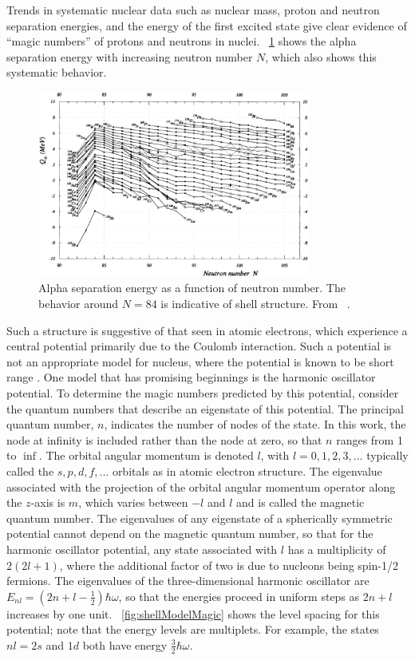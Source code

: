 Trends in systematic nuclear data such as nuclear mass, proton and neutron separation energies, and the energy of the first excited state give clear evidence of ``magic numbers'' of protons and neutrons in nuclei.  {\fig}~\ref{fig:alphaSep} shows the alpha separation energy with increasing neutron number $N$, which also shows this systematic behavior.  
\begin{figure}[htp]
\centering
\includegraphics[width=0.8\textwidth]{figures/alphaSepEnergy.eps}
\caption[Alpha separation energy as an illustration of shell structure.]{Alpha separation energy as a function of neutron number.  The behavior around $N=84$ is indicative of shell structure.  From {}~\cite{massEval_1993}.}
\label{fig:alphaSep}
\end{figure}
Such a structure is suggestive of that seen in atomic electrons, which experience a central potential primarily due to the Coulomb interaction.  Such a potential is not an appropriate model for nucleus, where the potential is known to be short range \citep{Casten}.  One model that has promising beginnings is the harmonic oscillator potential.  To determine the magic numbers predicted by this potential, consider the quantum numbers that describe an eigenstate of this potential.  The principal quantum number, $n$, indicates the number of nodes of the state.  In this work, the node at infinity is included rather than the node at zero, so that $n$ ranges from 1 to $\inf$.  The orbital angular momentum is denoted $l$, with $l = 0, 1, 2, 3, ...$ typically called the $s, p, d, f, ...$ orbitals as in atomic electron structure.  The eigenvalue associated with the projection of the orbital angular momentum operator along the $z$-axis is $m$, which varies between $-l$ and $l$ and is called the magnetic quantum number.  The eigenvalues of any eigenstate of a spherically symmetric potential cannot depend on the magnetic quantum number, so that for the harmonic oscillator potential, any state associated with $l$ has a multiplicity of $2(2l+1)$, where the additional factor of two is due to nucleons being spin-1/2 fermions.  The eigenvalues of the three-dimensional harmonic oscillator are $E_{nl} = (2n+l-\frac{1}{2})\hbar\omega$, so that the energies proceed in uniform steps as $2n+l$ increases by one unit.  {\fig}~\ref{fig:shellModelMagic} shows the level spacing for this potential; note that the energy levels are multiplets.  For example, the states $nl = 2s$ and $1d$ both have energy $\frac{3}{2}\hbar\omega$.  
